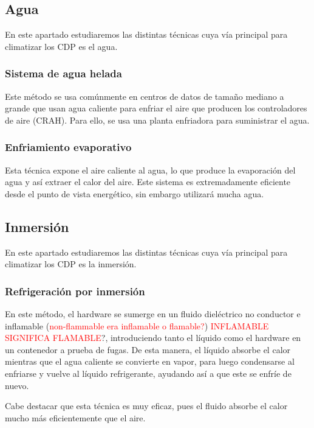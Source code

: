 \subsection{Agua}

En este apartado estudiaremos las distintas técnicas cuya vía principal para climatizar los CDP es el agua.

\subsubsection{Sistema de agua helada}

Este método se usa comúnmente en centros de datos de tamaño mediano a grande que usan agua caliente para enfriar el aire que producen los controladores de aire (CRAH). Para ello, se usa una planta enfriadora para suministrar el agua.

\subsubsection{Enfriamiento evaporativo}

Esta técnica expone el aire caliente al agua, lo que produce la evaporación del agua y así extraer el calor del aire. Este sistema es extremadamente eficiente desde el punto de vista energético, sin embargo utilizará mucha agua.

\subsection{Inmersión}

En este apartado estudiaremos las distintas técnicas cuya vía principal para climatizar los CDP es la inmersión.

\subsubsection{Refrigeración por inmersión}

En este método, el hardware se sumerge en un fluido dieléctrico no conductor e inflamable (\textcolor{red}{non-flammable era inflamable o flamable?}) \textcolor{red}{INFLAMABLE SIGNIFICA FLAMABLE}?, introduciendo tanto el líquido como el hardware en un contenedor a prueba de fugas. De esta manera, el líquido absorbe el calor mientras que el agua caliente se convierte en vapor, para luego condensarse al enfriarse y vuelve al líquido refrigerante, ayudando así a que este se enfríe de nuevo.

Cabe destacar que esta técnica es muy eficaz, pues el fluido absorbe el calor mucho más eficientemente que el aire.

